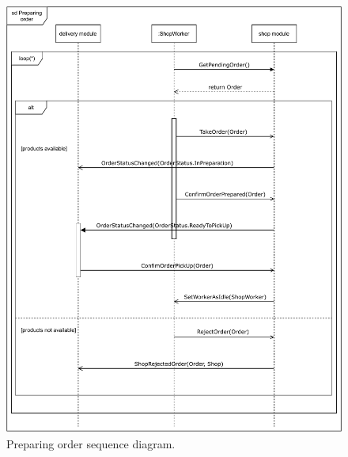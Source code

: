 \documentclass[../main.tex]{subfiles}
\begin{document}
\begin{figure}
\caption{Preparing order sequence diagram.}
\vspace{5mm}
\centering
\includegraphics[width=\textwidth]
{diagrams/sequence-diagrams/Shop.pdf}
\end{figure}
\end{document}
